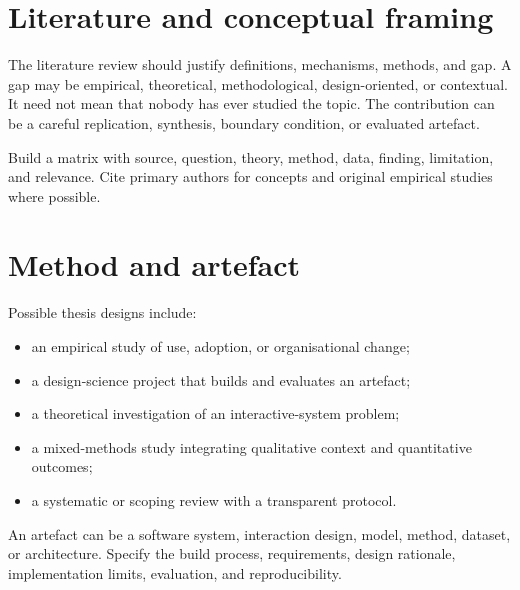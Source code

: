 \section{Literature and conceptual framing}
The literature review should justify definitions, mechanisms, methods, and gap. A gap may be empirical, theoretical, methodological, design-oriented, or contextual. It need not mean that nobody has ever studied the topic. The contribution can be a careful replication, synthesis, boundary condition, or evaluated artefact.

Build a matrix with source, question, theory, method, data, finding, limitation, and relevance. Cite primary authors for concepts and original empirical studies where possible.

\section{Method and artefact}
Possible thesis designs include:
\begin{itemize}
\item an empirical study of use, adoption, or organisational change;
\item a design-science project that builds and evaluates an artefact;
\item a theoretical investigation of an interactive-system problem;
\item a mixed-methods study integrating qualitative context and quantitative outcomes;
\item a systematic or scoping review with a transparent protocol.
\end{itemize}
An artefact can be a software system, interaction design, model, method, dataset, or architecture. Specify the build process, requirements, design rationale, implementation limits, evaluation, and reproducibility.

